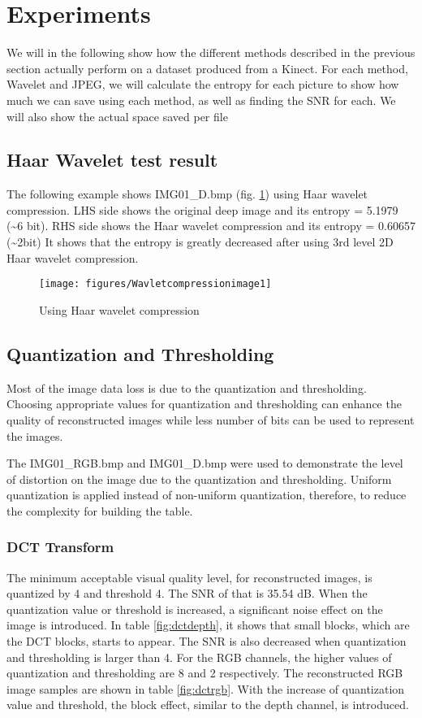 \section{Experiments}

We will in the following show how the different methods described in the previous section actually perform on a dataset produced from a Kinect.
For each method, Wavelet and JPEG, we will calculate the entropy for each picture to show how much we can save using each method, as well as finding the SNR for each. We will also show the actual space saved per file

\subsection{Haar Wavelet test result}
The following example shows IMG01\_D.bmp (fig. \ref{fig:haarwavelettest}) using Haar wavelet compression.
LHS side shows the original deep image and its entropy = 5.1979 (\textasciitilde 6 bit).
RHS side shows the Haar wavelet compression and its entropy = 0.60657 (\textasciitilde 2bit)
It shows that the entropy is greatly decreased after using 3rd level 2D Haar wavelet compression.

\begin{figure}[hbt]
  \center
        \texttt{[image: figures/Wavletcompressionimage1]}
        \caption{Using Haar wavelet compression}
  \label{fig:haarwavelettest}
\end{figure}


\subsection{Quantization and Thresholding}

Most of the image data loss is due to the quantization and thresholding. Choosing appropriate values for quantization and thresholding can enhance the quality of reconstructed images while less number of bits can be used to represent the images.

The IMG01\_RGB.bmp and IMG01\_D.bmp were used to demonstrate the level of distortion on the image due to the quantization and thresholding. Uniform quantization is applied instead of non-uniform quantization, therefore, to reduce the complexity for building the table. 

\subsubsection{DCT Transform}
The minimum acceptable visual quality level, for reconstructed images, is quantized by 4 and threshold 4.
The SNR of that is 35.54 dB. When the quantization value or threshold is increased, a significant noise effect on the image is introduced. 
In table \ref{fig:dctdepth}, it shows that small blocks, which are the DCT blocks, starts to appear. 
The SNR is also decreased when quantization and thresholding is larger than 4.
For the RGB channels, the higher values of quantization and thresholding are 8 and 
2 respectively. The reconstructed RGB image samples are shown in table \ref{fig:dctrgb}. 
With the increase of quantization value and threshold, the block effect, similar to the 
depth channel, is introduced.


